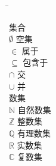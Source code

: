 \begin{notation}

\begin{tabbing}

  \hspace*{8em}\=\kill

  \textsf{集合} \\
  $\emptyset$  \> 空集 \\
  $\in$        \> 属于 \\
  $\subseteq$  \> 包含于 \\
  $\cap$       \> 交 \\
  $\cup$       \> 并 \\[\baselineskip]

  \textsf{数集} \\
  $\mathbb{N}$ \> 自然数集 \\
  $\mathbb{Z}$ \> 整数集 \\
  $\mathbb{Q}$ \> 有理数集 \\
  $\mathbb{R}$ \> 实数集 \\
  $\mathbb{C}$ \> 复数集 \\

\end{tabbing}

\end{notation}

